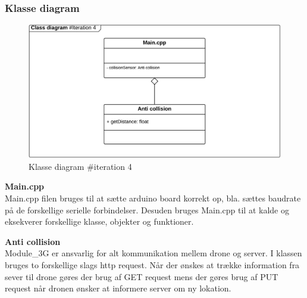\subsubsection*{Klasse diagram}
\vspace{-0.1cm}

\begin{figure}[H]
	\centering
	\includegraphics[width=1\textwidth]{Billeder/klasse_diagrammer/classdiagram_iteration4.png}
	\vspace{-0.5cm}
	\caption{Klasse diagram \#iteration 4}
	\label{fig:classDiagram_iteration4}
\end{figure}


\textbf{Main.cpp} \\
Main.cpp filen bruges til at sætte arduino board korrekt op, bla. sættes baudrate på de forskellige serielle forbindelser. Desuden bruges Main.cpp til at kalde og eksekverer forskellige klasse, objekter og funktioner.


\textbf{Anti collision} \\
Module\_3G er ansvarlig for alt kommunikation mellem drone og server. I klassen bruges to forskellige slags http request. Når der ønskes at trække information fra sever til drone gøres der brug af GET request mens der gøres brug af PUT request når dronen ønsker at informere server om ny lokation.
